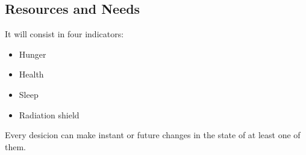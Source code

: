 
\subsection{Resources and Needs}
\indent

    It will consist in four indicators: 

    \begin{itemize}
        \item Hunger
        \item Health 
        \item Sleep 
        \item Radiation shield  
    \end{itemize}

    Every desicion can make instant or future changes in the state of at least one of them. 

